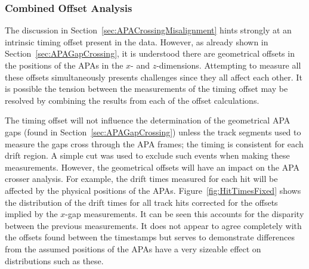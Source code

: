 

\subsubsection{Combined Offset Analysis}\label{sec:CombinedOffsets}

The discussion in Section~\ref{sec:APACrossingMisalignment} hints strongly at an intrinsic timing offset present in the data.  However, as already shown in Section~\ref{sec:APAGapCrossing}, it is understood there are geometrical offsets in the positions of the APAs in the $x$- and $z$-dimensions.  Attempting to measure all these offsets simultaneously presents challenges since they all affect each other.  It is possible the tension between the measurements of the timing offset may be resolved by combining the results from each of the offset calculations.

The timing offset will not influence the determination of the geometrical APA gaps (found in Section~\ref{sec:APAGapCrossing}) unless the track segments used to measure the gaps cross through the APA frames; the timing is consistent for each drift region.  A simple cut was used to exclude such events when making these measurements.  However, the geometrical offsets will have an impact on the APA crosser analysis.  For example, the drift times measured for each hit will be affected by the physical positions of the APAs.  Figure~\ref{fig:HitTimesFixed} shows the distribution of the drift times for all track hits corrected for the offsets implied by the $x$-gap measurements.  It can be seen this accounts for the disparity between the previous measurements.  It does not appear to agree completely with the offsets found between the timestamps but serves to demonstrate differences from the assumed positions of the APAs have a very sizeable effect on distributions such as these.

